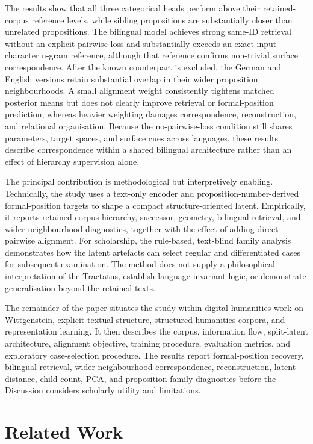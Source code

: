 \documentclass[webpdf,modern,medium,namedate]{oup-authoring-template}
\begin{document}
The results show that all three categorical heads perform above their retained-corpus reference levels, while sibling propositions are substantially closer than unrelated propositions. The bilingual model achieves strong same-ID retrieval without an explicit pairwise loss and substantially exceeds an exact-input character n-gram reference, although that reference confirms non-trivial surface correspondence. After the known counterpart is excluded, the German and English versions retain substantial overlap in their wider proposition neighbourhoods. A small alignment weight consistently tightens matched posterior means but does not clearly improve retrieval or formal-position prediction, whereas heavier weighting damages correspondence, reconstruction, and relational organisation. Because the no-pairwise-loss condition still shares parameters, target spaces, and surface cues across languages, these results describe correspondence within a shared bilingual architecture rather than an effect of hierarchy supervision alone.

The principal contribution is methodological but interpretively enabling. Technically, the study uses a text-only encoder and proposition-number-derived formal-position targets to shape a compact structure-oriented latent. Empirically, it reports retained-corpus hierarchy, successor, geometry, bilingual retrieval, and wider-neighbourhood diagnostics, together with the effect of adding direct pairwise alignment. For scholarship, the rule-based, text-blind family analysis demonstrates how the latent artefacts can select regular and differentiated cases for subsequent examination. The method does not supply a philosophical interpretation of the Tractatus, establish language-invariant logic, or demonstrate generalisation beyond the retained texts.

The remainder of the paper situates the study within digital humanities work on Wittgenstein, explicit textual structure, structured humanities corpora, and representation learning. It then describes the corpus, information flow, split-latent architecture, alignment objective, training procedure, evaluation metrics, and exploratory case-selection procedure. The results report formal-position recovery, bilingual retrieval, wider-neighbourhood correspondence, reconstruction, latent-distance, child-count, PCA, and proposition-family diagnostics before the Discussion considers scholarly utility and limitations.

\section{Related Work}
\end{document}
